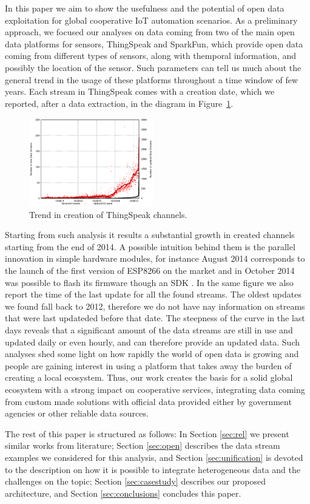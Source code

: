 In this paper we aim to show the usefulness and the potential of open data exploitation for global cooperative IoT automation scenarios.
As a preliminary approach, we focused our analyses on data coming from two of the main open data platforms for sensors, ThingSpeak and SparkFun, which provide open data coming from different types of sensors, along with themporal information, and possibly the location of the sensor.
Such parameters can tell us much about the general trend in the usage of these platforms throughout a time window of few years.
Each stream in ThingSpeak comes with a creation date, which we reported, after a data extraction, in the diagram in Figure~\ref{creationtrend}.
\begin{figure}[btp]
\centering
\includegraphics[width=0.48\textwidth]{img/bars.eps} 
\caption{Trend in creation of ThingSpeak channels.}
\label{creationtrend}
\end{figure}
Starting from such analysis it results a substantial growth in created channels starting from the end of 2014. 
A possible intuition behind them is the parallel innovation in simple hardware modules, for instance August 2014 corresponds to the launch of the first version of ESP8266 \cite{esp8266} on the market and in October 2014 was possible to flash its firmware though an SDK \cite{espressif}.
In the same figure we also report the time of the last update for all the found streams.
The oldest updates we found fall back to 2012, therefore we do not have nay information on streams that were last updateded before that date.
The steepness of the curve in the last days reveals that a significant amount of the data streams are still in use and updated daily or even hourly, and can therefore provide an updated data. Such analyses shed some light on how rapidly the world of open data is growing and people are gaining interest in using a platform that takes away the burden of creating a local ecosystem.
Thus, our work creates the basis for a solid global ecosystem with a strong impact on cooperative services, integrating data coming from custom made solutions with official data provided either by government agencies or other reliable data sources. 

The rest of this paper is structured as follows: In Section \ref{sec:rel} we present similar works from literature; Section \ref{sec:open} describes the data stream examples we considered for this analysis, and Section \ref{sec:unification} is devoted to the description on how it is possible to integrate heterogeneous data and the challenges on the topic; Section \ref{sec:casestudy} describes our proposed architecture, and Section \ref{sec:conclusions} concludes this paper.